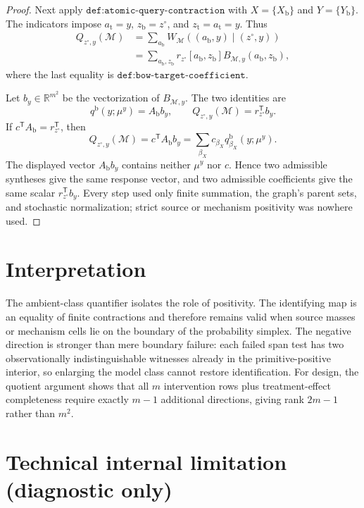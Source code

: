 \documentclass{article}
\begin{document}
\begin{proof}
Next apply \(\texttt{def:atomic-query-contraction}\) with \(X=\{X_{\mathrm b}\}\) and \(Y=\{Y_{\mathrm b}\}\).  The indicators impose \(a_{\mathrm t}=y\), \(z_{\mathrm b}=z^{\circ}\), and \(z_{\mathrm t}=a_{\mathrm t}=y\).  Thus
\[
\begin{aligned}
Q_{z^{\circ},y}(\mathcal M)
&=\sum_{a_{\mathrm b}}W_{\mathcal M}((a_{\mathrm b},y)\mid(z^{\circ},y))\\
&=\sum_{a_{\mathrm b},z_{\mathrm b}}
 r_{z^{\circ}}[a_{\mathrm b},z_{\mathrm b}]
 B_{\mathcal M,y}(a_{\mathrm b},z_{\mathrm b}),
\end{aligned}
\]
where the last equality is \(\texttt{def:bow-target-coefficient}\).

Let \(b_y\in\mathbb R^{m^2}\) be the vectorization of \(B_{\mathcal M,y}\).  The two identities are
\[
q^{\mathrm b}(y;\mu^y)=A_{\mathrm b}b_y,
\qquad
Q_{z^{\circ},y}(\mathcal M)=r_{z^{\circ}}^{\mathsf T}b_y.
\]
If \(c^{\mathsf T}A_{\mathrm b}=r_{z^{\circ}}^{\mathsf T}\), then
\[
Q_{z^{\circ},y}(\mathcal M)
=c^{\mathsf T}A_{\mathrm b}b_y
=\sum_{\beta_X}c_{\beta_X}q^{\mathrm b}_{\beta_X}(y;\mu^y).
\]
The displayed vector \(A_{\mathrm b}b_y\) contains neither \(\mu^y\) nor \(c\).  Hence two admissible syntheses give the same response vector, and two admissible coefficients give the same scalar \(r_{z^{\circ}}^{\mathsf T}b_y\).  Every step used only finite summation, the graph's parent sets, and stochastic normalization; strict source or mechanism positivity was nowhere used.
\end{proof}

\section{Interpretation}

The ambient-class quantifier isolates the role of positivity. The identifying map is an equality of finite contractions and therefore remains valid when source masses or mechanism cells lie on the boundary of the probability simplex. The negative direction is stronger than mere boundary failure: each failed span test has two observationally indistinguishable witnesses already in the primitive-positive interior, so enlarging the model class cannot restore identification. For design, the quotient argument shows that all \(m\) intervention rows plus treatment-effect completeness require exactly \(m-1\) additional directions, giving rank \(2m-1\) rather than \(m^2\).

\section*{Technical internal limitation (diagnostic only)}
\end{document}
